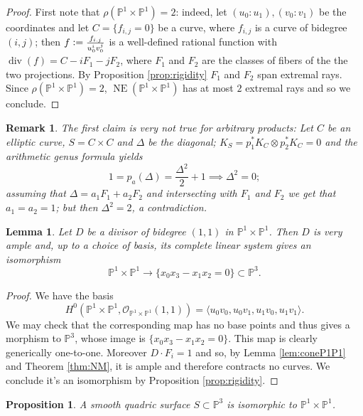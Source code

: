 \documentclass[a4paper,11pt]{amsart}
\newtheorem{lemma}[theorem]{Lemma}
\newtheorem{proposition}[theorem]{Proposition}
\newtheorem{remark}[theorem]{Remark}
\def\NE{\operatorname{NE}}
\def\divv{\operatorname{div}}
\newcommand{\OO}{\mathcal{O}}
\newcommand{\PP}{\mathbb{P}}
\newcommand{\defeq}{\vcentcolon=}
\begin{document}
\begin{proof}
	First note that $\rho(\PP^1 \times \PP^1) = 2$:
	indeed, let $(u_0:u_1), (v_0:v_1)$ be the coordinates and let $C = \{f_{i,j} = 0\}$ be a curve, where $f_{i,j}$ is a curve of bidegree $(i,j)$;
	then $f \defeq \frac{f_{i.j}}{u_0^iv_0^j}$ is a well-defined rational function with $\divv(f) = C - iF_1 - jF_2$, where $F_1$ and $F_2$ are the classes of fibers of the the two projections.
	By Proposition \ref{prop:rigidity} $F_1$ and $F_2$ span extremal rays.
	Since $\rho(\PP^1 \times \PP^1) = 2$, $\NE(\PP^1 \times \PP^1)$ has at most $2$ extremal rays and so we conclude.
\end{proof}

\begin{remark}
	The first claim is very not true for arbitrary products:
	Let $C$ be an elliptic curve, $S = C \times C$ and $\Delta$ be the diagonal;
	$K_S = p_1^*K_C \otimes p_2^*K_C = 0$ and the arithmetic genus formula yields
	\[
	1 = p_a(\Delta) = \frac{\Delta^2}{2} + 1 \implies \Delta^2 = 0;
	\]
	assuming that $\Delta = a_1F_1 + a_2F_2$ and intersecting with $F_1$ and $F_2$ we get that $a_1 = a_2 = 1$;
	but then $\Delta^2 = 2$, a contradiction.
\end{remark}

\begin{lemma}\label{lem:imageOfP1P1}
	Let $D$ be a divisor of bidegree $(1,1)$ in $\PP^1 \times \PP^1$.
	Then $D$ is very ample and, up to a choice of basis, its complete linear system gives an isomorphism
	\[
	\PP^1 \times \PP^1 \to \{x_0x_3 - x_1x_2 = 0\} \subset \PP^3.
	\]
\end{lemma}

\begin{proof}
	We have the basis
	\[
	H^0(\PP^1 \times \PP^1,\OO_{\PP^1 \times \PP^1}(1,1)) = \langle u_0v_0, u_0v_1, u_1v_0, u_1v_1 \rangle.
	\]
	We may check that the corresponding map has no base points and thus gives a morphism to $\PP^3$, whose image is $\{x_0x_3 - x_1x_2 = 0\}$.
	This map is clearly generically one-to-one.
	Moreover $D \cdot F_i =1$ and so, by Lemma \ref{lem:coneP1P1} and Theorem \ref{thm:NM}, it is ample and therefore contracts no curves.
	We conclude it's an isomorphism by Proposition \ref{prop:rigidity}.
\end{proof}



\begin{proposition}\label{prop:quadricP1P1}
	A smooth quadric surface $S \subset \PP^3$ is isomorphic to $\PP^1 \times \PP^1$.
\end{proposition}
\end{document}

